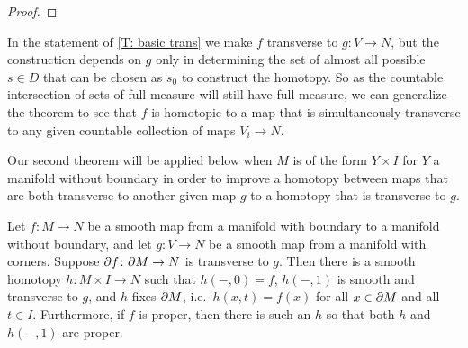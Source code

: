 \begin{proof}

\end{proof}

\begin{remark}\label{R: countable trans}
	In the statement of \cref{T: basic trans} we make $f$ transverse to $g \colon V \to N$, but the construction depends on $g$ only in determining the set of almost all possible $s\in D$ that can be chosen as $s_0$ to construct the homotopy.
	So as the countable intersection of sets of full measure will still have full measure, we can generalize the theorem to see that $f$ is homotopic to a map that is simultaneously transverse to any given countable collection of maps $V_i \to N$.
\end{remark}

Our second theorem will be applied below when $M$ is of the form $Y \times I$ for $Y$ a manifold without boundary in order to improve a homotopy between maps that are both transverse to another given map $g$ to a homotopy that is transverse to $g$.

\begin{theorem}\label{T: homotopy trans}
	Let $f \colon M \to N$ be a smooth map from a manifold with boundary to a manifold without boundary, and let $g \colon V \to N$ be a smooth map from a manifold with corners.
	Suppose $\partial f \colon \partial M \to N$ is transverse to $g$.
	Then there is a smooth homotopy $h \colon M \times I \to N$ such that $h(-,0) = f$, $h(-,1)$ is smooth and transverse to $g$, and $h$ fixes $\partial M$, i.e.\ $h(x,t)=f(x)$ for all $x \in \partial M$ and all $t \in I$.
	Furthermore, if $f$ is proper, then there is such an $h$ so that both $h$ and $h(-,1)$ are proper.
\end{theorem}

